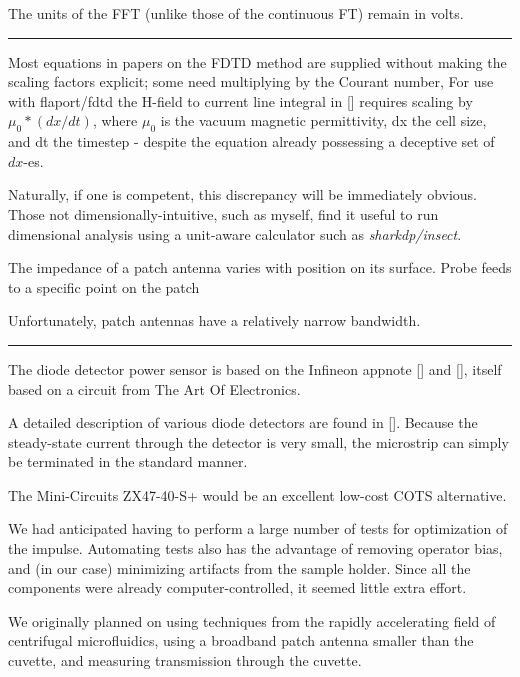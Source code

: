 \documentclass[paper.tex]{subfiles}
\begin{document}
The units of the FFT (unlike those of the continuous FT) remain in volts.

\rule{\linewidth}{0.2pt}

Most equations in papers on the FDTD method are supplied without making the scaling factors explicit; some need multiplying by the Courant number, For use with flaport/fdtd the H-field to current line integral in [] requires scaling by $\mu_0 * (dx/dt)$, where $\mu_0$ is the vacuum magnetic permittivity, dx the cell size, and dt the timestep - despite the equation already possessing a deceptive set of $dx$-es.

Naturally, if one is competent, this discrepancy will be immediately obvious. Those not dimensionally-intuitive, such as myself, find it useful to run dimensional analysis using a unit-aware calculator such as {\it sharkdp/insect}.


The impedance of a patch antenna varies with position on its surface. Probe feeds to a specific point on the patch

Unfortunately, patch antennas have a relatively narrow bandwidth.

\rule{\linewidth}{0.2pt}



The diode detector power sensor is based on the Infineon appnote [] and [], itself based on a circuit from The Art Of Electronics. 

A detailed description of various diode detectors are found in []. Because the steady-state current through the detector is very small, the microstrip can simply be terminated in the standard manner.

The Mini-Circuits ZX47-40-S+ would be an excellent low-cost COTS alternative.

\printbibliography[heading=none, title={}, keyword={rectifier}]


We had anticipated having to perform a large number of tests for optimization of the impulse. Automating tests also has the advantage of removing operator bias, and (in our case) minimizing artifacts from the sample holder. Since all the components were already computer-controlled, it seemed little extra effort.

We originally planned on using techniques from the rapidly accelerating field of centrifugal microfluidics, using a broadband patch antenna smaller than the cuvette, and measuring transmission through the cuvette.
\end{document}
